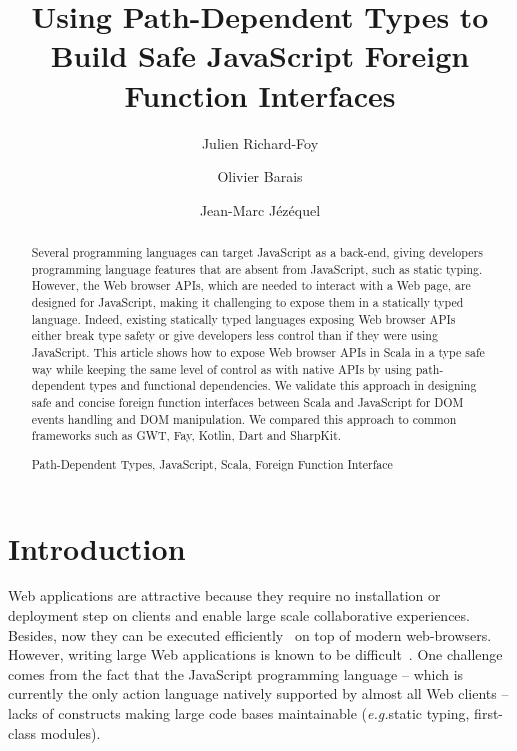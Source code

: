 \documentclass[runningheads,a4paper]{llncs}
\newcommand{\keywords}[1]{\par\addvspace\baselineskip
\noindent\keywordname\enspace\ignorespaces#1}
\newcommand{\eg}{\emph{e.g.}}
\begin{document}
\mainmatter

\title{Using Path-Dependent Types to Build Safe JavaScript Foreign Function Interfaces}

\author{Julien Richard-Foy \and Olivier Barais\and Jean-Marc Jézéquel}


\maketitle


\begin{abstract}
Several programming languages can target JavaScript as a back-end, giving developers programming
language features that are absent from JavaScript, such as static typing. However, the Web browser
APIs, which are needed to interact with a Web page, are designed for JavaScript, making it
challenging to expose them in a statically typed language. Indeed, existing statically typed
languages exposing Web browser APIs either break type safety or give developers less control than if
they were using JavaScript. This article shows how to expose Web browser APIs in Scala in a type
safe way while keeping the same level of control as with native APIs by using path-dependent types
and functional dependencies. We validate this approach in designing safe and concise foreign
function interfaces between Scala and JavaScript for DOM events handling and DOM manipulation. We
compared this approach to common frameworks such as GWT, Fay, Kotlin, Dart and SharpKit.
\keywords{Path-Dependent Types, JavaScript, Scala, Foreign Function Interface}
\end{abstract}


\section{Introduction}

Web applications are attractive because they require no installation or deployment step on clients
and enable large scale collaborative experiences. Besides, now they can be executed
efficiently~\cite{Gal:2009:TJT:1542476.1542528} on top of modern web-browsers. However, writing
large Web applications is known to be
difficult~\cite{Mikkonen08_SpaghettiJs,Preciado05_RIAMethodologyNecessity}. One challenge comes from
the fact that the JavaScript programming language -- which is currently the only action language
natively supported by almost all Web clients -- lacks of constructs making large code bases
maintainable (\eg static typing, first-class modules).
\end{document}
